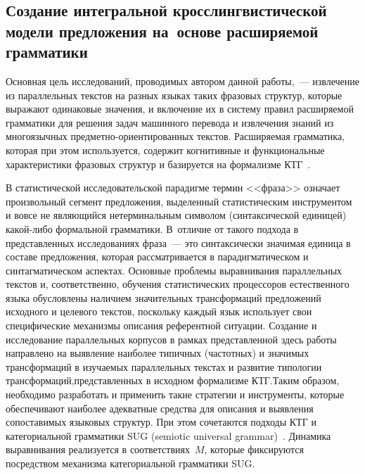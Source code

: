 \begin{multicols}{2}
\section{Создание интегральной кросслингвистической модели 
предложения на~основе расширяемой грамматики}
  
  Основная цель исследований, проводимых автором данной работы,~--- 
извлечение из параллельных текстов на разных языках таких фразовых 
структур, которые выражают одинаковые значения, и включение их в 
систему правил рас\-ши\-ря\-емой грамматики для решения задач машинного 
перевода и извлечения знаний из многоязычных 
  пред\-мет\-но-ори\-ен\-ти\-ро\-ван\-ных текстов. Рас\-ши\-ря\-емая грамматика, 
которая при этом используется, содержит когнитивные и функциональные 
характеристики фразовых структур и базируется на формализме 
КТГ~\cite{1-koz}. 
  
  В статистической исследовательской парадигме термин <<фраза>> означает 
произвольный сегмент предложения, выделенный статистическим 
инструментом и вовсе не являющийся нетерминальным символом 
(синтаксической единицей) ка\-кой-ли\-бо формальной грамматики. 
В~отличие от такого подхода в представленных исследованиях фраза~--- это 
синтаксически значимая единица в составе предложения, которая 
рассматривается в парадигматическом и синтагматическом аспектах. 
Основные проблемы выравнивания параллельных\linebreak
 текстов и, соответственно, 
обучения стати\-сти\-ческих процессоров естественного языка обуслов\-лены 
наличием значительных трансформаций\linebreak
 предложений исходного и целевого 
текстов, поскольку каждый язык использует свои специфические механизмы 
описания референтной ситуации. Создание и исследование параллельных 
корпусов в рамках пред\-став\-лен\-ной здесь работы направлено на выявление 
наиболее типичных (частотных) и значимых трансформаций в изучаемых 
параллельных текстах и развитие типологии трансформаций,\linebreak представленных 
в исходном формализме КТГ.\linebreak Таким образом, необходимо разработать и 
применить такие стратегии и инструменты, которые обеспечивают наиболее 
адекватные средства для описания и выявления сопоставимых языковых 
структур.
    При этом сочетаются подходы КТГ и 
категориальной грамматики SUG (semiotic universal 
  grammar)~\cite{2-koz, 3-koz}. Динамика выравнивания реализуется в 
соответствиях~$M$, которые фиксируются посредством механизма 
категориальной грамматики SUG.
  

\end{multicols}
